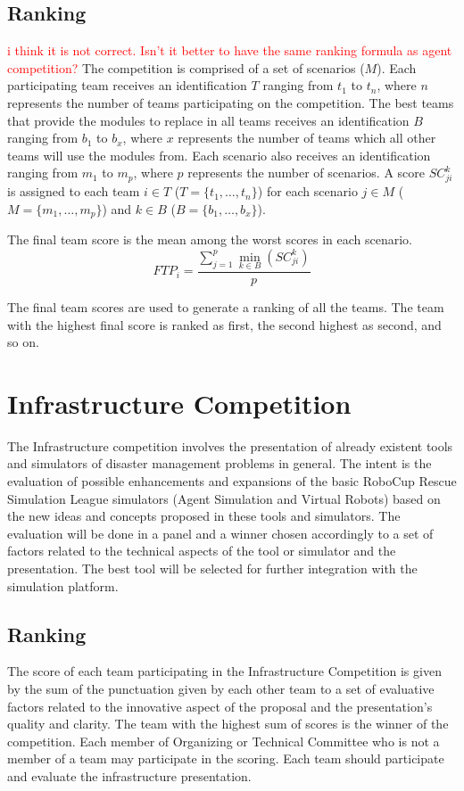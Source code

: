 \documentclass{article}
\begin{document}
\subsection{Ranking}
\textcolor{red}{i think it is not correct. Isn't it better to have the same ranking formula as agent competition?}
The competition is comprised of a set of scenarios ($M$). Each participating team receives an identification $T$ ranging from $t_{1}$ to $t_{n}$, where $n$ represents the number of teams participating on the competition. The best teams that provide the modules to replace in all teams receives an identification $B$ ranging from $b_{1}$ to $b_{x}$, where $x$ represents the number of teams which all other teams will use the modules from. Each scenario also receives an identification ranging from $m_{1}$ to $m_{p}$, where $p$ represents the number of scenarios. A score $SC_{ji}^{k}$ is assigned to each team $i \in T$ ($T = \{t_{1},\dots,t_{n}\}$) for each scenario $j \in M$ ($M = \{m_{1},\dots,m_{p}\}$) and $k \in B$ ($B = \{b_{1},\dots,b_{x}\}$).


The final team score is the mean among the worst scores in each scenario.
\begin{equation}
FTP_{i} = \frac{\sum_{j=1}^{p}{\min_{k \in B}(SC_{ji}^{k})}}{p}
\end{equation}

The final team scores are used to generate a ranking of all the teams. The team with the highest final score is ranked as first, the second highest as second, and so on.

\section{Infrastructure Competition}
\label{sec:infrastructure}
The Infrastructure competition involves the presentation of already existent tools and simulators of disaster management problems in general. The intent is the evaluation of possible enhancements and expansions of the basic RoboCup Rescue Simulation League simulators (Agent Simulation and Virtual Robots) based on the new ideas and concepts proposed in these tools and simulators. The evaluation will be done in a panel and a winner chosen accordingly to a set of factors related to the technical aspects of the tool or simulator and the presentation. The best tool will be selected for further integration with the simulation platform.
\subsection{Ranking}
The score of each team participating in the Infrastructure Competition is given by the sum of the punctuation given by each other team to a set of evaluative factors related to the innovative aspect of the proposal and the presentation's quality and clarity. The team with the highest sum of scores is the winner of the competition. Each member of Organizing or Technical Committee who is not a member of a team may participate in the scoring. Each team should participate and evaluate the infrastructure presentation.
\end{document}

